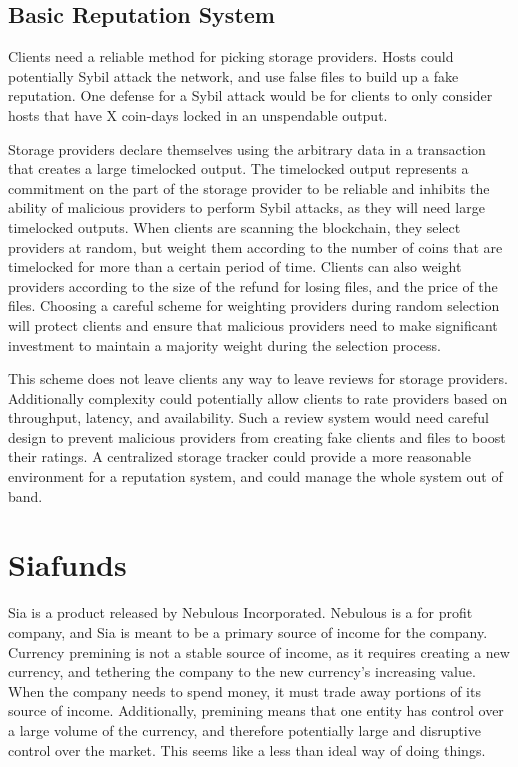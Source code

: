\documentclass[twocolumn]{article}
\begin{document}
\subsection{Basic Reputation System}
Clients need a reliable method for picking storage providers.
Hosts could potentially Sybil attack the network, and use false files to build up a fake reputation.
One defense for a Sybil attack would be for clients to only consider hosts that have X coin-days locked in an unspendable output.

Storage providers declare themselves using the arbitrary data in a transaction that creates a large timelocked output.
The timelocked output represents a commitment on the part of the storage provider to be reliable and inhibits the ability of malicious providers to perform Sybil attacks, as they will need large timelocked outputs.
When clients are scanning the blockchain, they select providers at random, but weight them according to the number of coins that are timelocked for more than a certain period of time.
Clients can also weight providers according to the size of the refund for losing files, and the price of the files.
Choosing a careful scheme for weighting providers during random selection will protect clients and ensure that malicious providers need to make significant investment to maintain a majority weight during the selection process.

This scheme does not leave clients any way to leave reviews for storage providers.
Additionally complexity could potentially allow clients to rate providers based on throughput, latency, and availability.
Such a review system would need careful design to prevent malicious providers from creating fake clients and files to boost their ratings.
A centralized storage tracker could provide a more reasonable environment for a reputation system, and could manage the whole system out of band.

\section{Siafunds}
Sia is a product released by Nebulous Incorporated.
Nebulous is a for profit company, and Sia is meant to be a primary source of income for the company.
Currency premining is not a stable source of income, as it requires creating a new currency, and tethering the company to the new currency's increasing value.
When the company needs to spend money, it must trade away portions of its source of income.
Additionally, premining means that one entity has control over a large volume of the currency, and therefore potentially large and disruptive control over the market.
This seems like a less than ideal way of doing things.
\end{document}

